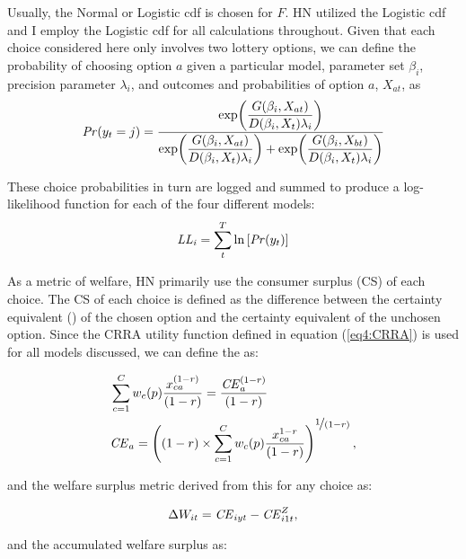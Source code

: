 \documentclass[../main.tex]{subfiles}
\begin{document}
Usually, the Normal or Logistic cdf is chosen for $F$.
HN utilized the Logistic cdf and I employ the Logistic cdf for all calculations throughout.
Given that each choice considered here only involves two lottery options, we can define the probability of choosing option $a$ given a particular model, parameter set $\beta_i$, precision parameter $\lambda_i$, and outcomes and probabilities of option $a$, $X_{at}$, as
\begin{equation}
	\label{eq4:RE.f}
	{\ensuremath{\mathit{Pr}}}(y_t=j) =\dfrac{\exp\!\left( \dfrac{ G(\beta_i,X_{at}) }{ D(\beta_i,X_{t})\lambda_i }  \right)}{  \exp\!\left( \dfrac{ G(\beta_i,X_{at}) }{ D(\beta_i,X_{t})\lambda_i }  \right) + \exp\!\left( \dfrac{ G(\beta_i,X_{bt}) }{ D(\beta_i,X_{t})\lambda_i }  \right)    }
\end{equation}

\noindent These choice probabilities in turn are logged and summed to produce a log-likelihood function for each of the four different models:
\begin{equation}
	\label{eq4:ll}
	\mathit{LL_i} = \sum_{t}^T \ln \left[ {\mathit{Pr}}(y_t) \right]
\end{equation}

As a metric of welfare, HN primarily use the consumer surplus (CS) of each choice.
The CS of each choice is defined as the difference between the certainty equivalent ({\CE}) of the chosen option and the certainty equivalent of the unchosen option.
Since the CRRA utility function defined in equation (\ref{eq4:CRRA}) is used for all models discussed, we can define the {\CE} as:

\begin{align}
	\label{eq4:CEcalc}
	\begin{split}
		&\sum_{c=1}^{C} w_c(p) \frac{x_{ca}^{(1-r)}}{(1-r)} = \frac{ {\mathit{CE}}_a^{(1-r)}}{(1-r)}\\
		&{\mathit{CE}}_a =  \left( (1-r) \times \sum_{c=1}^{C} w_c(p) \frac{x_{ca}^{1-r}}{(1-r)} \right)^{ \displaystyle\nicefrac{1}{(1-r)} } ,
	\end{split}
\end{align}

\noindent and the welfare surplus metric derived from this {\CE} for any choice as:

\begin{equation}
	\label{eq4:wsurplus}
	\Delta W_{it} =  {\mathit{CE}}_{iyt} - {\mathit{CE}}_{i1t}^Z ,
\end{equation}

\noindent and the accumulated welfare surplus as:
\end{document}
